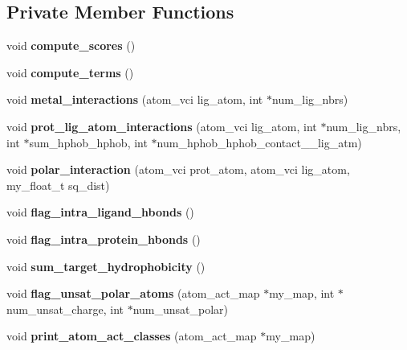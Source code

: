 \subsection*{Private Member Functions}
\begin{CompactItemize}
\item 
void \textbf{compute\_\-scores} ()\label{classASCbase_1_1ProtLigScore_020f3f7d5ed48200fee48009a7bd0981}

\item 
void \textbf{compute\_\-terms} ()\label{classASCbase_1_1ProtLigScore_3273df40e4af4de8771f42a171ff49b9}

\item 
void \textbf{metal\_\-interactions} (atom\_\-vci lig\_\-atom, int $\ast$num\_\-lig\_\-nbrs)\label{classASCbase_1_1ProtLigScore_43197dcbdb8db5e8134c4536593a1554}

\item 
void \textbf{prot\_\-lig\_\-atom\_\-interactions} (atom\_\-vci lig\_\-atom, int $\ast$num\_\-lig\_\-nbrs, int $\ast$sum\_\-hphob\_\-hphob, int $\ast$num\_\-hphob\_\-hphob\_\-contact\_\_\-lig\_\-atm)\label{classASCbase_1_1ProtLigScore_35a77eb830e6ea30f0f7e0974337e507}

\item 
void \textbf{polar\_\-interaction} (atom\_\-vci prot\_\-atom, atom\_\-vci lig\_\-atom, my\_\-float\_\-t sq\_\-dist)\label{classASCbase_1_1ProtLigScore_f0ffc28a9f7912538c6a50ddbd892af3}

\item 
void \textbf{flag\_\-intra\_\-ligand\_\-hbonds} ()\label{classASCbase_1_1ProtLigScore_52feb68979289cc9695aaf867c54694e}

\item 
void \textbf{flag\_\-intra\_\-protein\_\-hbonds} ()\label{classASCbase_1_1ProtLigScore_9bf29dd817db457447811f73f49e3dff}

\item 
void \textbf{sum\_\-target\_\-hydrophobicity} ()\label{classASCbase_1_1ProtLigScore_15510c6a4dd67ed6855d344a4ea26806}

\item 
void \textbf{flag\_\-unsat\_\-polar\_\-atoms} (atom\_\-act\_\-map $\ast$my\_\-map, int $\ast$num\_\-unsat\_\-charge, int $\ast$num\_\-unsat\_\-polar)\label{classASCbase_1_1ProtLigScore_d98d4a8ed3743a00db0f83efe90d0f1e}

\item 
void \textbf{print\_\-atom\_\-act\_\-classes} (atom\_\-act\_\-map $\ast$my\_\-map)\label{classASCbase_1_1ProtLigScore_b56c70e1c49a08b5b8bd3b52b508b43d}

\end{CompactItemize}
